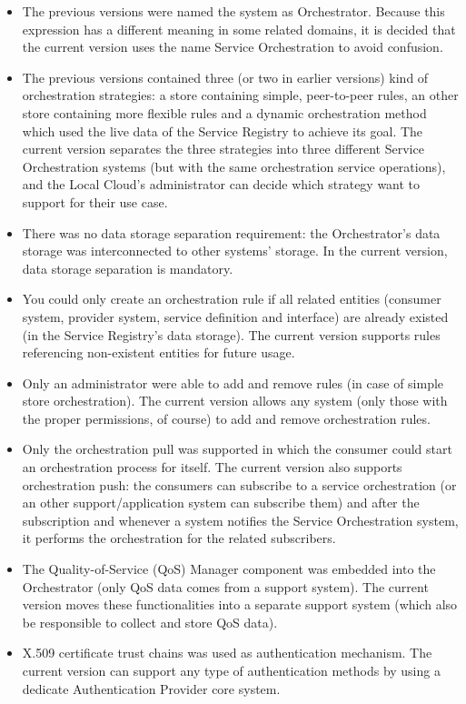 \documentclass[a4paper]{arrowhead}
\begin{document}
\begin{itemize}
    \item The previous versions were named the system as Orchestrator. Because this expression has a different meaning in some related domains, it is decided that the current version uses the name Service Orchestration to avoid confusion.
    \item The previous versions contained three (or two in earlier versions) kind of orchestration strategies: a store containing simple, peer-to-peer rules, an other store containing more flexible rules and a dynamic orchestration method which used the live data of the Service Registry to achieve its goal. The current version separates the three strategies into three different Service Orchestration systems (but with the same orchestration service operations), and the Local Cloud's administrator can decide which strategy want to support for their use case.
    \item There was no data storage separation requirement: the Orchestrator's data storage was interconnected to other systems' storage. In the current version, data storage separation is mandatory. 
    \item You could only create an orchestration rule if all related entities (consumer system, provider system, service definition and interface) are already existed (in the Service Registry's data storage). The current version supports rules referencing non-existent entities for future usage. 
    \item Only an administrator were able to add and remove rules (in case of simple store orchestration). The current version allows any system (only those with the proper permissions, of course) to add and remove orchestration rules.
    \item Only the orchestration pull was supported in which the consumer could start an orchestration process for itself. The current version also supports orchestration push: the consumers can subscribe to a service orchestration (or an other support/application system can subscribe them) and after the subscription and whenever a system notifies the Service Orchestration system, it performs the orchestration for the related subscribers.
    \item The Quality-of-Service (QoS) Manager component was embedded into the Orchestrator (only QoS data comes from a support system). The current version moves these functionalities into a separate support system (which also be responsible to collect and store QoS data).
    \item X.509 certificate trust chains was used as authentication mechanism. The current version can support any type of authentication methods by using a dedicate Authentication Provider core system. 
\end{itemize}
\end{document}
